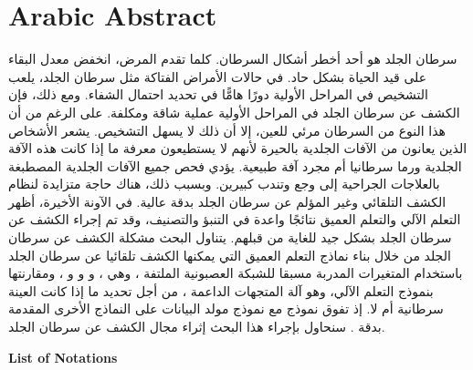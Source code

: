 \documentclass[12pt]{diazessay}
\begin{document}
    \section*{Arabic Abstract}
    \begin{RLtext}
    سرطان الجلد هو أحد أخطر أشكال السرطان. كلما تقدم المرض، انخفض معدل البقاء على قيد الحياة بشكل حاد. في حالات الأمراض الفتاكة مثل سرطان الجلد، يلعب التشخيص في المراحل الأولية دورًا هامًّا في تحديد احتمال الشفاء. ومع ذلك، فإن الكشف عن سرطان الجلد في المراحل الأولية عملية شاقة ومكلفة. على الرغم من أن هذا النوع من السرطان مرئي للعين، إلا أن ذلك لا يسهل التشخيص. يشعر الأشخاص الذين يعانون من الآفات الجلدية بالحيرة لأنهم لا يستطيعون معرفة ما إذا كانت هذه الآفة الجلدية ورما سرطانيا أم مجرد آفة طبيعية. يؤدي فحص جميع الآفات الجلدية المصطبغة بالعلاجات الجراحية إلى وجع وتندب كبيرين. وبسبب ذلك، هناك حاجة متزايدة لنظام الكشف التلقائي وغير المؤلم عن سرطان الجلد بدقة عالية. في الآونة الأخيرة، أظهر التعلم الآلي والتعلم العميق نتائجًا واعدة في التنبؤ والتصنيف، وقد تم إجراء الكشف عن سرطان الجلد بشكل جيد للغاية من قبلهم.
    يتناول البحث مشكلة الكشف عن سرطان الجلد من خلال بناء نماذج التعلم العميق التي يمكنها الكشف تلقائيا عن سرطان الجلد باستخدام المتغيرات المدربة مسبقا للشبكة العصبونية الملتفة ، وهي ، و  و  و ، ومقارنتها بنموذج التعلم الآلي، وهو آلة المتجهات الداعمة ، من أجل تحديد ما إذا كانت العينة سرطانية أم لا. إذ تفوق نموذج  مع نموذج مولد البيانات  على النماذج الأخرى المقدمة بدقة . 
    سنحاول بإجراء هذا البحث إثراء مجال الكشف عن سرطان الجلد.
    \end{RLtext}
    
    \newpage
    \tableofcontents
    \newpage
    \listoffigures 
    \listoftables 
    \newpage


{\Large \textbf{List of Notations} \par}
\thispagestyle{notations}

\vspace{1cm}
\end{document}
